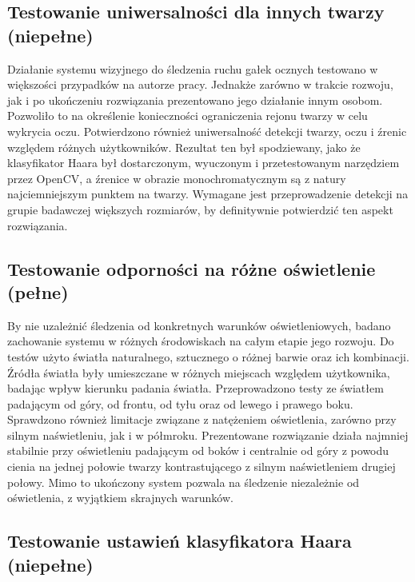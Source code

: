 \documentclass[a4paper,twoside,12pt]{book}
\begin{document}
\subsection{Testowanie uniwersalności dla innych twarzy (niepełne)}
\label{subsec:Testowanie-twarzy}

Działanie systemu wizyjnego do śledzenia ruchu gałek ocznych testowano w większości przypadków na autorze pracy. Jednakże zarówno w trakcie rozwoju, jak i po ukończeniu rozwiązania prezentowano jego działanie innym osobom. Pozwoliło to na określenie konieczności ograniczenia rejonu twarzy w celu wykrycia oczu. Potwierdzono również uniwersalność detekcji twarzy, oczu i źrenic względem różnych użytkowników. Rezultat ten był spodziewany, jako że klasyfikator Haara był dostarczonym, wyuczonym i przetestowanym narzędziem przez OpenCV, a źrenice w obrazie monochromatycznym są z natury najciemniejszym punktem na twarzy. Wymagane jest przeprowadzenie detekcji na grupie badawczej większych rozmiarów, by definitywnie potwierdzić ten aspekt rozwiązania.

\subsection{Testowanie odporności na różne oświetlenie (pełne)}
\label{subsec:Testowanie-oswietlenie}

By nie uzależnić śledzenia od konkretnych warunków oświetleniowych, badano zachowanie systemu w różnych środowiskach na całym etapie jego rozwoju. Do testów użyto światła naturalnego, sztucznego o różnej barwie oraz ich kombinacji. Źródła światła były umieszczane w różnych miejscach względem użytkownika, badając wpływ kierunku padania światła. Przeprowadzono testy ze światłem padającym od góry, od frontu, od tyłu oraz od lewego i prawego boku. Sprawdzono również limitacje związane z natężeniem oświetlenia, zarówno przy silnym naświetleniu, jak i w półmroku. Prezentowane rozwiązanie działa najmniej stabilnie przy oświetleniu padającym od boków i centralnie od góry z powodu cienia na jednej połowie twarzy kontrastującego z silnym naświetleniem drugiej połowy. Mimo to ukończony system pozwala na śledzenie niezależnie od oświetlenia, z wyjątkiem skrajnych warunków.

\subsection{Testowanie ustawień klasyfikatora Haara (niepełne)}
\label{subsec:Testowanie-funkcji}
\end{document}
